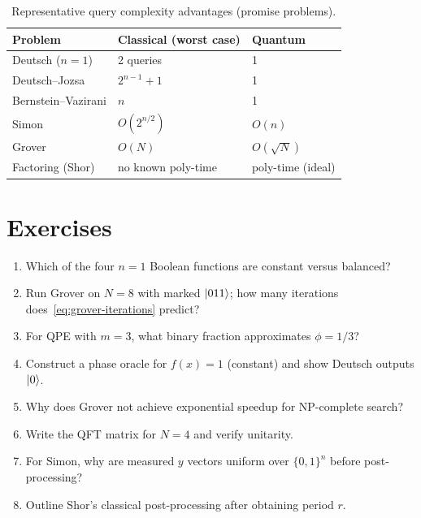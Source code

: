 \begin{table}[H]
\centering
\caption{Representative query complexity advantages (promise problems).}
\label{tab:algo-complexity}
\begin{tabular}{@{}lll@{}}
\toprule
Problem & Classical (worst case) & Quantum \\
\midrule
Deutsch ($n=1$) & 2 queries & 1 \\
Deutsch--Jozsa & $2^{n-1}+1$ & 1 \\
Bernstein--Vazirani & $n$ & 1 \\
Simon & $O(2^{n/2})$ & $O(n)$ \\
Grover & $O(N)$ & $O(\sqrt{N})$ \\
Factoring (Shor) & no known poly-time & poly-time (ideal) \\
\bottomrule
\end{tabular}
\end{table}

\section*{Exercises}
\begin{enumerate}[label=\arabic*.]
\item Which of the four $n=1$ Boolean functions are constant versus balanced?
\item Run Grover on $N=8$ with marked $\ket{011}$; how many iterations does~\eqref{eq:grover-iterations} predict?
\item For QPE with $m=3$, what binary fraction approximates $\phi=1/3$?
\item Construct a phase oracle for $f(x)=1$ (constant) and show Deutsch outputs $\ket{0}$.
\item Why does Grover not achieve exponential speedup for NP-complete search?
\item Write the QFT matrix for $N=4$ and verify unitarity.
\item For Simon, why are measured $y$ vectors uniform over $\{0,1\}^n$ before post-processing?
\item Outline Shor's classical post-processing after obtaining period $r$.
\end{enumerate}

